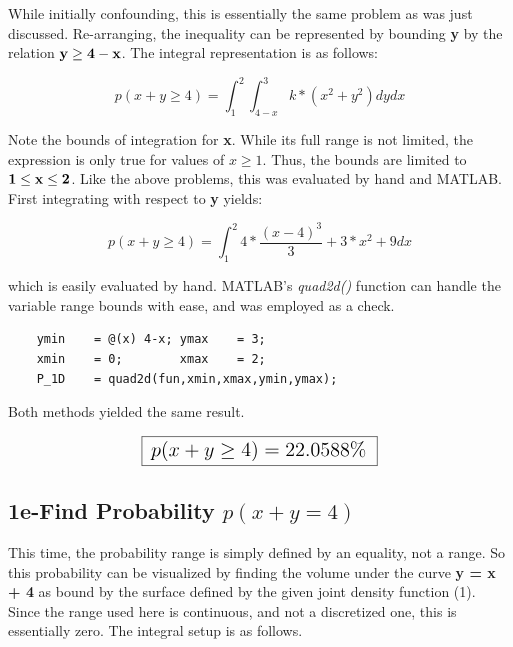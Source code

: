 \documentclass[]{article}
\begin{document}
While initially confounding, this is essentially the same problem as was just discussed. Re-arranging, the inequality can be represented by bounding {\bf y} by the relation ${\bf y \ge 4 - x }$. The integral representation is as follows:

\begin{displaymath}
	p(x+y \ge 4 )  = \int_1^2{\int_{4-x}^3 {k*(x^2+y^2)   dy} dx }
\end{displaymath}  

\noindent Note the bounds of integration for {\bf x}. While its full range is not limited, the expression is only true for values of $x \ge 1$. Thus, the bounds are limited to ${\bf 1 \le x \le 2}$. Like the above problems, this was evaluated by hand and MATLAB. First integrating with respect to {\bf y} yields:


\begin{displaymath}
	p(x+y \ge 4 )  = \int_1^2{4*\frac{(x - 4)^3}{3} + 3*x^2 + 9} dx 
\end{displaymath}  

\noindent which is easily evaluated by hand. MATLAB's \emph{quad2d()} function can handle the variable range bounds with ease, and was employed as a check. 

\begin{lstlisting}
	ymin    = @(x) 4-x;	ymax    = 3;
	xmin    = 0; 		xmax    = 2;
	P_1D    = quad2d(fun,xmin,xmax,ymin,ymax);
\end{lstlisting}

\noindent Both methods yielded the same result. 

\begin{displaymath}
	\fbox {   \Large $p(x+y \ge 4 )  = 22.0588\%$  }
\end{displaymath}  




\subsection*{1e-Find Probability $ p(x+y = 4 )   $}

This time, the probability range is simply defined by an equality, not a range. So this probability can be visualized by finding the volume under the curve {\bf y = x + 4} as bound by the surface defined by the given joint density function (1). Since the range used here is continuous, and not a discretized one, this is essentially zero. The integral setup is as follows.
\end{document}
